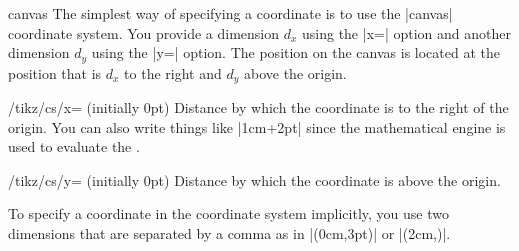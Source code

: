 \begin{coordinatesystem}{canvas}
    The simplest way of specifying a coordinate is to use the |canvas|
    coordinate system. You provide a dimension $d_x$ using the |x=| option and
    another dimension $d_y$ using the |y=| option. The position on the canvas
    is located at the position that is $d_x$ to the right and $d_y$ above the
    origin.

    \begin{key}{/tikz/cs/x= (initially 0pt)}
        Distance by which the coordinate is to the right of the origin. You can
        also write things like |1cm+2pt| since the mathematical engine is used
        to evaluate the .
    \end{key}

    \begin{key}{/tikz/cs/y= (initially 0pt)}
        Distance by which the coordinate is above the origin.
    \end{key}

\begin{codeexample}[]
\end{codeexample}

    To specify a coordinate in the coordinate system implicitly, you use two
    dimensions that are separated by a comma as in |(0cm,3pt)| or
    |(2cm,\textheight)|.
\begin{codeexample}[]
\end{codeexample}
\end{coordinatesystem}

